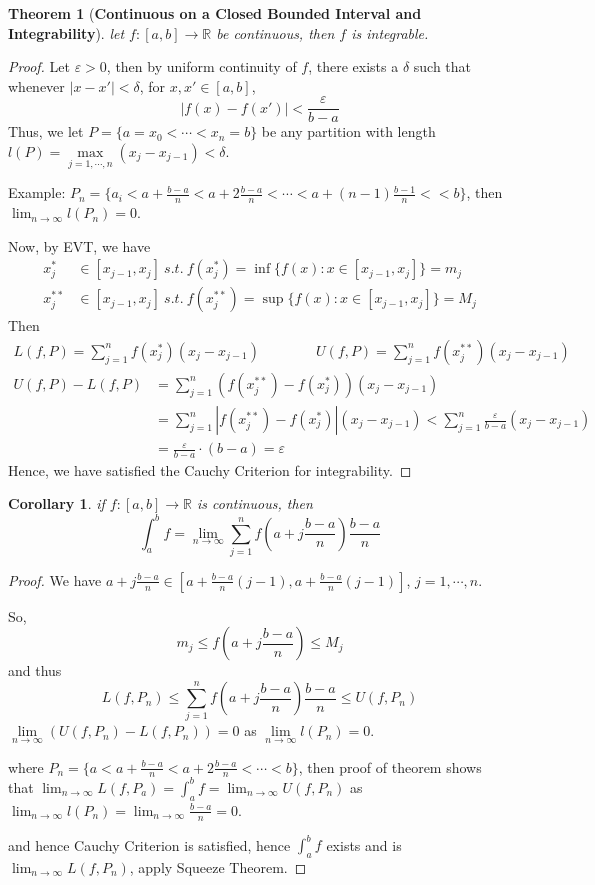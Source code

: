 \documentclass[12pt]{article}
\theoremstyle{plain}
\newtheorem{theorem}{Theorem}[subsection]
\newtheorem{corollary}{Corollary}[subsection]
\newcommand{\abs}[1]{\left| #1 \right|}
\newcommand{\ep}{\varepsilon}
\newcommand{\dlim}{\displaystyle\lim\limits}
\begin{document}
	\begin{theorem}[\textbf{Continuous on a Closed Bounded Interval and 
		Integrability}]
		let $f:[a,b]\to\mathbb{R}$ be continuous, then $f$ is integrable. 
	\end{theorem}
	\begin{proof}
		Let $\ep>0$, then by uniform continuity of $f$, there exists a $\delta$
		such that whenever $\abs{x-x'}<\delta$, for $x, x'\in[a,b]$, 
		\[
			\abs{f(x)-f(x')} < \frac{\ep}{b-a}
		\]
		Thus, we let $P=\{a=x_0<\cdots<x_n = b\}$ be any partition with length
		$l(P) = \underset{j=1,\cdots, n}{\max} (x_{j}-x_{j-1})<\delta$.  
		
		\textcolor{Periwinkle}
		{Example: $P_n = \{a_i<a+\frac{b-a}n<a+2\frac{b-a}n
		<\cdots<a+(n-1)\frac{b-1}n<<b\}$, then $\lim_{n\to\infty} l(P_n)=0$}.

		Now, by EVT, we have 
		\begin{align*}
			x^*_j &\in [x_{j-1}, x_j] \ s.t. \ 
			f(x^*_j)=\inf\{f(x):x\in [x_{j-1},x_j]\} = m_j\\
			x^{**}_j &\in [x_{j-1}, x_j] \ s.t. \ 
			f(x^{**}_j)=\sup\{f(x):x\in [x_{j-1},x_j]\} = M_j
		\end{align*}
		Then 
		\begin{align*}
			L(f,P) = \sum_{j=1}^n f(x_j^*)
			(x_j-x_{j-1})
			\qquad \qquad 
			U(f,P) = \sum_{j=1}^n f(x_j^{**})(x_j-x_{j-1})
		\end{align*}
		\begin{align*}
			U(f,P)-L(f,P)
			&= \sum_{j=1}^n (f(x^{**}_j)-f(x_j^*))(x_j-x_{j-1})\\
			&=\sum_{j=1}^n \abs{f(x_j^{**})-f(x^*_j)}(x_j-x_{j-1})
				<\sum_{j=1}^n \frac{\ep}{b-a}(x_j-x_{j-1}) \\
			&=\frac{\ep}{b-a} \cdot (b-a) =\ep
		\end{align*}
		Hence, we have satisfied the Cauchy Criterion for integrability. 
	\end{proof}

	\begin{corollary}
		if $f:[a,b]\to\mathbb{R}$ is continuous, then 
		\[
			\int_a^b f 
			= \lim_{n\to\infty} \sum_{j=1}^n f(a+j\frac{b-a}n)\frac{b-a}n 
		\]
	\end{corollary}
	\begin{proof}
		We have $a+j\frac{b-a}n \in [a+\frac{b-a}n (j-1),a+\frac{b-a}n(j-1)]$,
		$j=1,\cdots, n$. 
		
		So, 
		\[
			m_j \leq f(a+j\frac{b-a}n) \leq M_j
		\]
		and thus 
		\[
			L(f,P_n) \leq \sum_{j=1}^nf(a+j\frac{b-a}n) \frac{b-a}n \leq 
			U(f,P_n) 
		\]
		$\dlim_{n\to\infty} (U(f,P_n) - L(f,P_n)) = 0$ as 
		$\dlim_{n\to\infty} l(P_n) = 0$. 
		
		where $P_n = \{a<a+\frac{b-a}n <a+2\frac{b-a}n <\cdots<b\}$, 
		then proof of theorem shows that $\lim_{n\to\infty} L(f,P_a)
		=\int^b_a f = \lim_{n\to\infty} U(f,P_n)$ as $\lim_{n\to\infty}
		l(P_n) = \lim_{n\to\infty} \frac{b-a}n = 0$. 
 
		and hence Cauchy Criterion is satisfied, hence
		$\int_a^b f$ exists and is $\lim_{n\to\infty} L(f,P_n)$, 
		apply Squeeze Theorem. 
	\end{proof}
\end{document}
